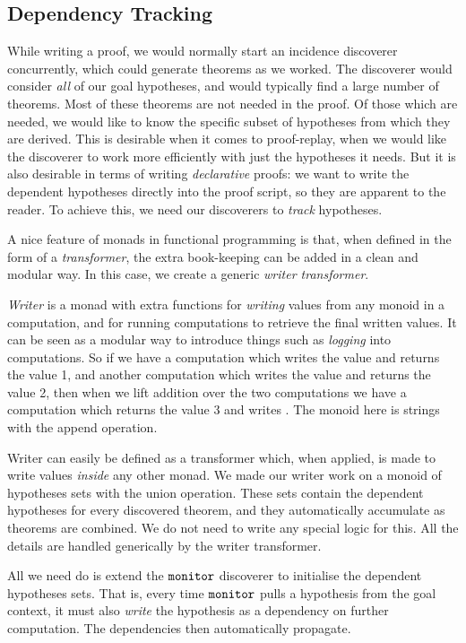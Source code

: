 \subsection{Dependency Tracking}
While writing a proof, we would normally start an incidence discoverer concurrently, which could generate theorems as we worked. The discoverer would consider \emph{all} of our goal hypotheses, and would typically find a large number of theorems. Most of these theorems are not needed in the proof. Of those which are needed, we would like to know the specific subset of hypotheses from which they are derived. This is desirable when it comes to proof-replay, when we would like the discoverer to work more efficiently with just the hypotheses it needs. But it is also desirable in terms of writing \emph{declarative} proofs: we want to write the dependent hypotheses directly into the proof script, so they are apparent to the reader. To achieve this, we need our discoverers to  \emph{track} hypotheses.

A nice feature of monads in functional programming is that, when defined in the form of a \emph{transformer}, the extra book-keeping can be added in a clean and modular way. In this case, we create a generic \emph{writer transformer}.

\emph{Writer} is a monad with extra functions for \emph{writing} values from any monoid in a computation, and for running computations to retrieve the final written values. It can be seen as a modular way to introduce things such as \emph{logging} into computations. So if we have a computation which writes the value  and returns the value 1, and another computation which writes the value  and returns the value 2, then when we lift addition over the two computations we have a computation which returns the value 3 and writes . The monoid here is strings with the append operation.

Writer can easily be defined as a transformer which, when applied, is made to write values \emph{inside} any other monad. We made our writer work on a monoid of hypotheses sets with the union operation. These sets contain the dependent hypotheses for every discovered theorem, and they automatically accumulate as theorems are combined. We do not need to write any special logic for this. All the details are handled generically by the writer transformer.

All we need do is extend the $\texttt{monitor}$ discoverer to initialise the dependent hypotheses sets. That is, every time $\texttt{monitor}$ pulls a hypothesis from the goal context, it must also \emph{write} the hypothesis as a dependency on further computation. The dependencies then automatically propagate. 


